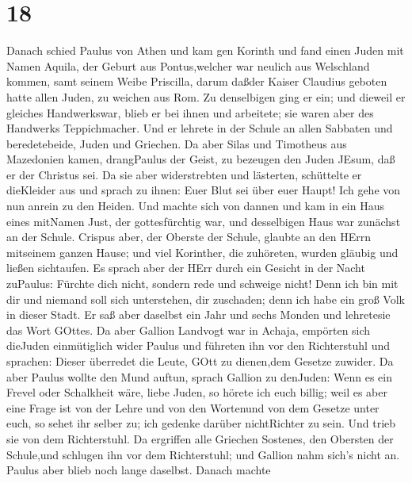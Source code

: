 \hypertarget{section-17}{%
\section{18}\label{section-17}}

 Danach schied Paulus von Athen und kam gen Korinth
 und fand einen Juden mit Namen Aquila, der Geburt aus
Pontus,welcher war neulich aus Welschland kommen, samt seinem Weibe
Priscilla, darum daßder Kaiser Claudius geboten hatte allen Juden, zu
weichen aus Rom.  Zu denselbigen ging er ein; und dieweil er
gleiches Handwerkswar, blieb er bei ihnen und arbeitete; sie waren aber
des Handwerks Teppichmacher.  Und er lehrete in der Schule
an allen Sabbaten und beredetebeide, Juden und Griechen.  Da
aber Silas und Timotheus aus Mazedonien kamen, drangPaulus der Geist, zu
bezeugen den Juden JEsum, daß er der Christus sei.  Da sie
aber widerstrebten und lästerten, schüttelte er dieKleider aus und
sprach zu ihnen: Euer Blut sei über euer Haupt! Ich gehe von nun anrein
zu den Heiden.  Und machte sich von dannen und kam in ein
Haus eines mitNamen Just, der gottesfürchtig war, und desselbigen Haus
war zunächst an der Schule.  Crispus aber, der Oberste der
Schule, glaubte an den HErrn mitseinem ganzen Hause; und viel Korinther,
die zuhöreten, wurden gläubig und ließen sichtaufen.  Es
sprach aber der HErr durch ein Gesicht in der Nacht zuPaulus: Fürchte
dich nicht, sondern rede und schweige nicht!  Denn ich bin
mit dir und niemand soll sich unterstehen, dir zuschaden; denn ich habe
ein groß Volk in dieser Stadt.  Er saß aber daselbst ein
Jahr und sechs Monden und lehretesie das Wort GOttes.  Da
aber Gallion Landvogt war in Achaja, empörten sich dieJuden einmütiglich
wider Paulus und führeten ihn vor den Richterstuhl  und
sprachen: Dieser überredet die Leute, GOtt zu dienen,dem Gesetze
zuwider.  Da aber Paulus wollte den Mund auftun, sprach
Gallion zu denJuden: Wenn es ein Frevel oder Schalkheit wäre, liebe
Juden, so hörete ich euch billig;  weil es aber eine Frage
ist von der Lehre und von den Wortenund von dem Gesetze unter euch, so
sehet ihr selber zu; ich gedenke darüber nichtRichter zu sein.
 Und trieb sie von dem Richterstuhl.  Da
ergriffen alle Griechen Sostenes, den Obersten der Schule,und schlugen
ihn vor dem Richterstuhl; und Gallion nahm sich's nicht an.
 Paulus aber blieb noch lange daselbst. Danach machte
